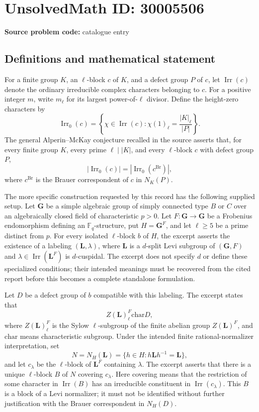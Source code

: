 \documentclass[11pt]{article}
\begin{document}
\section*{UnsolvedMath ID: 30005506}
\textbf{Source problem code:} catalogue entry
\subsection{Definitions and mathematical statement}
For a finite group \(K\), an \(\ell\)-block \(c\) of \(K\), and a defect group \(P\) of \(c\), let \(\operatorname{Irr}(c)\) denote the ordinary irreducible complex characters belonging to \(c\). For a positive integer \(m\), write \(m_\ell\) for its largest power-of-\(\ell\) divisor. Define the height-zero characters by
\[
\operatorname{Irr}_0(c)=\left\{\chi\in\operatorname{Irr}(c):\chi(1)_\ell=\frac{|K|_\ell}{|P|}\right\}.
\]
The general Alperin--McKay conjecture recalled in the source asserts that, for every finite group \(K\), every prime \(\ell\mid |K|\), and every \(\ell\)-block \(c\) with defect group \(P\),
\[
|\operatorname{Irr}_0(c)|=|\operatorname{Irr}_0(c^{\mathrm{Br}})|,
\]
where \(c^{\mathrm{Br}}\) is the Brauer correspondent of \(c\) in \(N_K(P)\).

The more specific construction requested by this record has the following supplied setup. Let \(\mathbf G\) be a simple algebraic group of simply connected type \(B\) or \(C\) over an algebraically closed field of characteristic \(p>0\). Let \(F:\mathbf G\to\mathbf G\) be a Frobenius endomorphism defining an \(\mathbb F_q\)-structure, put \(H=\mathbf G^F\), and let \(\ell\geq5\) be a prime distinct from \(p\). For every isolated \(\ell\)-block \(b\) of \(H\), the excerpt asserts the existence of a labeling \((\mathbf L,\lambda)\), where \(\mathbf L\) is a \(d\)-split Levi subgroup of \((\mathbf G,F)\) and \(\lambda\in\operatorname{Irr}(\mathbf L^F)\) is \(d\)-cuspidal. The excerpt does not specify \(d\) or define these specialized conditions; their intended meanings must be recovered from the cited report before this becomes a complete standalone formulation.

Let \(D\) be a defect group of \(b\) compatible with this labeling. The excerpt states that
\[
Z(\mathbf L)^F_\ell\mathrel{\mathrm{char}}D,
\]
where \(Z(\mathbf L)^F_\ell\) is the Sylow \(\ell\)-subgroup of the finite abelian group \(Z(\mathbf L)^F\), and \(\mathrel{\mathrm{char}}\) means characteristic subgroup. Under the intended finite rational-normalizer interpretation, set
\[
N=N_H(\mathbf L)=\{h\in H:h\mathbf Lh^{-1}=\mathbf L\},
\]
and let \(c_\lambda\) be the \(\ell\)-block of \(\mathbf L^F\) containing \(\lambda\). The excerpt asserts that there is a unique \(\ell\)-block \(B\) of \(N\) covering \(c_\lambda\). Here covering means that the restriction of some character in \(\operatorname{Irr}(B)\) has an irreducible constituent in \(\operatorname{Irr}(c_\lambda)\). This \(B\) is a block of a Levi normalizer; it must not be identified without further justification with the Brauer correspondent in \(N_H(D)\).
\end{document}
